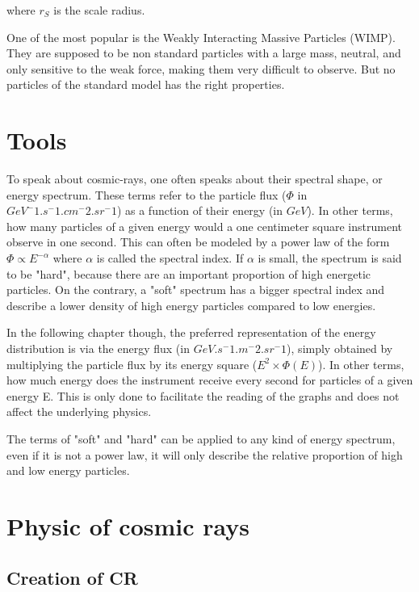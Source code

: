 where $r_S$ is the scale radius.

One of the most popular is the Weakly Interacting Massive Particles (WIMP). They are supposed to be non standard particles with a large mass, neutral, and only sensitive to the weak force, making them very difficult to observe. But no particles of the standard model has the right properties. 


\section{Tools}

To speak about cosmic-rays, one often speaks about their spectral shape, or energy spectrum. These terms refer to the particle flux ($\Phi$ in $GeV^-1.s^-1.cm^-2.sr^-1$) as a function of their energy (in $GeV$).  In other terms, how many particles of a given energy would a one centimeter square instrument observe in one second. This can often be modeled by a power law of the form $\Phi \propto E^{-\alpha}$  where $\alpha$ is called the spectral index. If $\alpha$ is small, the spectrum is said to be "hard", because there are an important proportion of high energetic particles. On the contrary, a "soft" spectrum has a bigger spectral index and describe a lower density of high energy particles compared to low energies.

In the following chapter though, the preferred representation of the energy distribution is via the energy flux (in $GeV.s^-1.m^-2.sr^-1$), simply obtained by multiplying the particle flux by its energy square ($E^2 \times \Phi(E)$). In other terms, how much energy does the instrument receive every second for particles of a given energy E. This is only done to facilitate the reading of the graphs and does not affect the underlying physics.

The terms of "soft" and "hard" can be applied to any kind of energy spectrum, even if it is not a power law, it will only describe the relative proportion of high and low energy particles.




\section{Physic of cosmic rays}

\subsection{Creation of CR}
\label{sec:creation_of_CRs}

